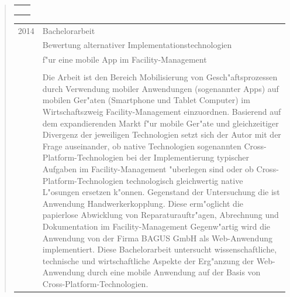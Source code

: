 \begin{quote}
\begin{tabular}{p{4cm}l}
\begin{minipage}{10cm}
		\end{minipage}\\\\\\
	\end{tabular}
%
	\begin{tabular}{p{4cm}l}
		2014&Bachelorarbeit\\
		&\qquad Bewertung alternativer Implementationstechnologien\\
		&\qquad  f"ur eine mobile App im Facility-Management\\\\
		&\begin{minipage}{10cm}
		Die Arbeit ist den Bereich Mobilisierung von Gesch"aftsprozessen durch Verwendung mobiler Anwendungen (sogenannter Apps) auf mobilen Ger"aten (Smartphone und Tablet Computer) im Wirtschaftszweig Facility-Management einzuordnen. Basierend auf dem expandierenden Markt f"ur mobile Ger"ate und gleichzeitiger Divergenz der jeweiligen Technologien setzt sich der Autor mit der Frage auseinander, ob native Technologien sogenannten Cross-Platform-Technologien bei der Implementierung typischer Aufgaben im Facility-Management "uberlegen sind oder ob Cross-Platform-Technologien technologisch gleichwertig native L"osungen ersetzen k"onnen. Gegenstand der Untersuchung die ist Anwendung Handwerkerkopplung. Diese erm"oglicht die papierlose Abwicklung von Reparaturauftr"agen, Abrechnung und Dokumentation im Facility-Management Gegenw"artig wird die Anwendung von der Firma BAGUS GmbH als Web-Anwendung implementiert. Diese Bachelorarbeit untersucht wissenschaftliche, technische und wirtschaftliche Aspekte der Erg"anzung der Web-Anwendung durch eine mobile Anwendung auf der Basis von Cross-Platform-Technologien.
		

\end{minipage}
\end{tabular}
\end{quote}
